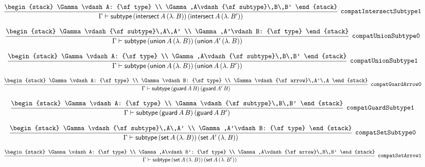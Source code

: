 \[
\infer[{\tt compatIntersectSubtype1}]{\Gamma \vdash {\sf subtype}\,({\sf intersect}\,A\,(\lambda .\,B))\,({\sf intersect}\,A\,(\lambda .\,B'))}{
\begin{stack}
\Gamma \vdash A: {\sf type}
\\
\Gamma ,A\vdash {\sf subtype}\,B\,B'
\end{stack}}
\]

\[
\infer[{\tt compatUnionSubtype0}]{\Gamma \vdash {\sf subtype}\,({\sf union}\,A\,(\lambda .\,B))\,({\sf union}\,A'\,(\lambda .\,B))}{
\begin{stack}
\Gamma \vdash {\sf subtype}\,A\,A'
\\
\Gamma ,A'\vdash B: {\sf type}
\end{stack}}
\]

\[
\infer[{\tt compatUnionSubtype1}]{\Gamma \vdash {\sf subtype}\,({\sf union}\,A\,(\lambda .\,B))\,({\sf union}\,A\,(\lambda .\,B'))}{
\begin{stack}
\Gamma \vdash A: {\sf type}
\\
\Gamma ,A\vdash {\sf subtype}\,B\,B'
\end{stack}}
\]

\[
\infer[{\tt compatGuardArrow0}]{\Gamma \vdash {\sf subtype}\,({\sf guard}\,A\,B)\,({\sf guard}\,A'\,B)}{
\begin{stack}
\Gamma \vdash A: {\sf type}
\\
\Gamma \vdash B: {\sf type}
\\
\Gamma \vdash {\sf arrow}\,A'\,A
\end{stack}}
\]

\[
\infer[{\tt compatGuardSubtype1}]{\Gamma \vdash {\sf subtype}\,({\sf guard}\,A\,B)\,({\sf guard}\,A\,B')}{
\begin{stack}
\Gamma \vdash A: {\sf type}
\\
\Gamma \vdash {\sf subtype}\,B\,B'
\end{stack}}
\]

\[
\infer[{\tt compatSetSubtype0}]{\Gamma \vdash {\sf subtype}\,({\sf set}\,A\,(\lambda .\,B))\,({\sf set}\,A'\,(\lambda .\,B))}{
\begin{stack}
\Gamma \vdash {\sf subtype}\,A\,A'
\\
\Gamma ,A'\vdash B: {\sf type}
\end{stack}}
\]

\[
\infer[{\tt compatSetArrow1}]{\Gamma \vdash {\sf subtype}\,({\sf set}\,A\,(\lambda .\,B))\,({\sf set}\,A\,(\lambda .\,B'))}{
\begin{stack}
\Gamma \vdash A: {\sf type}
\\
\Gamma ,A\vdash B': {\sf type}
\\
\Gamma ,A\vdash {\sf arrow}\,B\,B'
\end{stack}}
\]

